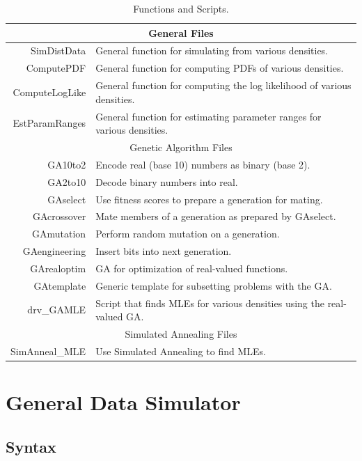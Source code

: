 \documentclass{book}
\newcommand{\textcode}[1]{\textsf{\small #1}}   %
\begin{document}
\begin{table}[htbp]
\begin{center}
\begin{tabular}{rp{3.5in}}
\multicolumn{2}{c}{General Files} \\ \hline\hline
SimDistData & General function for simulating from various densities. \\
ComputePDF & General function for computing PDFs of various densities. \\
ComputeLogLike & General function for computing the log likelihood of
various densities. \\
EstParamRanges & General function for estimating parameter ranges for
various densities. \\ \hline\hline
\multicolumn{2}{c}{Genetic Algorithm Files} \\ \hline\hline
GA10to2 & Encode real (base 10) numbers as binary (base 2). \\
GA2to10 & Decode binary numbers into real. \\
GAselect & Use fitness scores to prepare a generation for mating. \\
GAcrossover & Mate members of a generation as prepared by \textcode{%
GAselect}. \\
GAmutation & Perform random mutation on a generation. \\
GAengineering & Insert bits into next generation. \\
GArealoptim & GA for optimization of real-valued functions. \\
GAtemplate & Generic template for subsetting problems with the GA. \\
drv\_GAMLE & Script that finds MLEs for various densities using the
real-valued GA. \\ \hline\hline
\multicolumn{2}{c}{Simulated Annealing Files} \\ \hline\hline
SimAnneal\_MLE & Use Simulated Annealing to find MLEs.
\end{tabular}
\end{center}
\par
\vspace*{0.5pc}
\caption{Functions and Scripts.}
\label{tab_funscr}
\end{table}

\section{General Data Simulator}

\subsection*{Syntax}
\end{document}
